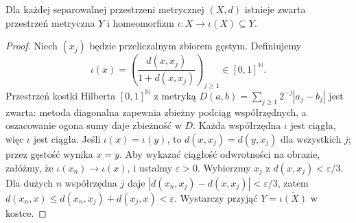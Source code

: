 \begin{lemat}
\label{lem:hilbert-cube-22}
Dla każdej separowalnej przestrzeni metrycznej $(X,d)$
istnieje zwarta przestrzeń metryczna $Y$ i homeomorfizm
$\iota:X\to\iota(X)\subseteq Y$.
\end{lemat}
\begin{proof}
Niech $(x_j)$ będzie przeliczalnym zbiorem gęstym.
Definiujemy
\[
\iota(x)=\left(\frac{d(x,x_j)}{1+d(x,x_j)}\right)_{j\ge1}
\in[0,1]^{\mathbb N}.
\]
Przestrzeń kostki Hilberta $[0,1]^{\mathbb N}$ z metryką
$D(a,b)=\sum_{j\ge1}2^{-j}|a_j-b_j|$ jest zwarta:
metoda diagonalna zapewnia zbieżny podciąg współrzędnych,
a oszacowanie ogona sumy daje zbieżność w $D$.
Każda współrzędna $\iota$ jest ciągła, więc
$\iota$ jest ciągła. Jeśli $\iota(x)=\iota(y)$,
to $d(x,x_j)=d(y,x_j)$ dla wszystkich $j$;
przez gęstość wynika $x=y$.
Aby wykazać ciągłość odwrotności na obrazie, załóżmy,
że $\iota(x_n)\to\iota(x)$, i ustalmy $\varepsilon>0$.
Wybierzmy $x_j$ z $d(x,x_j)<\varepsilon/3$.
Dla dużych $n$ współrzędna $j$ daje
$|d(x_n,x_j)-d(x,x_j)|<\varepsilon/3$,
zatem $d(x_n,x)\le d(x_n,x_j)+d(x_j,x)<\varepsilon$.
Wystarczy przyjąć $Y=\overline{\iota(X)}$ w kostce.
\end{proof}

